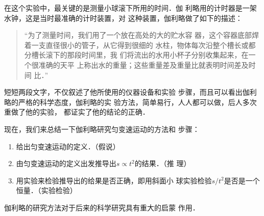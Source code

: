     在这个实验中，最关键的是测量小球滚下所用的时间．伽
利略用的计时器是一架水钟，这是当时最准确的计时装置，对
这种装置，伽利略做了如下的描述：

\begin{quotation}
    “为了测量时间，我们用了一个放在高处的大的贮水容
器，这个容器底部焊着一支直径很小的管子，从它得到很细的
水柱，物体每次沿整个槽长或都分槽长滚下的那段时间里，我
们将流出的水用小杯子分别收集起来，在一个很准确的天平
上称出水的重量；这些重量差及重量比就表明时间差及时间
比．”
\end{quotation}

    短短两段文字，不仅叙述了他所使用的仪器设备和实验
步骤，而且可以看出伽利略的严格的科学态度，伽利略的实
验方法，简单易行，人人都可以做，后人多次重做了他的实验，
都证实了他的结论的正确．

    现在，我们来总结一下伽利略研究匀变速运动的方法和
步骤：
\begin{enumerate}
\item 给出匀变速运动的定义．（假说）
\item 由匀变速运动的定义出发推导出$s\propto t^2$的结果．（推
理）
\item 用实验来检验推导出的给果是否正确，即用斜面小
球实验检验$s/t^2$是否是一个恒量．（实验检验）
\end{enumerate}

伽利略的研究方法对于后来的科学研究具有重大的启蒙
作用．


